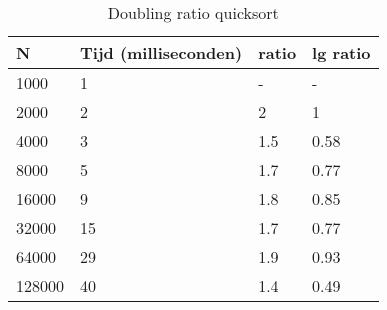 \documentclass[11pt, a4paper]{article}
\begin{document}
\begin{table}[H]
\centering
\begin{tabular}{|llll|}
\hline
\multicolumn{1}{|l|}{\textbf{N}} & \multicolumn{1}{l|}{\textbf{Tijd (milliseconden)}} & \multicolumn{1}{l|}{\textbf{ratio}} & \textbf{lg ratio} \\ \hline
1000                             & 1                                                  & -                                   & -                 \\
2000                             & 2                                                  & 2                                   & 1                 \\
4000                             & 3                                                  & 1.5                                 & 0.58              \\
8000                             & 5                                                  & 1.7                                 & 0.77              \\
16000                            & 9                                                  & 1.8                                 & 0.85              \\
32000                            & 15                                                 & 1.7                                 & 0.77              \\
64000                            & 29                                                 & 1.9                                 & 0.93              \\
128000                           & 40                                                 & 1.4                                 & 0.49              \\ \hline
\end{tabular}
\caption{Doubling ratio quicksort}
\end{table}

\newpage
\end{document}
